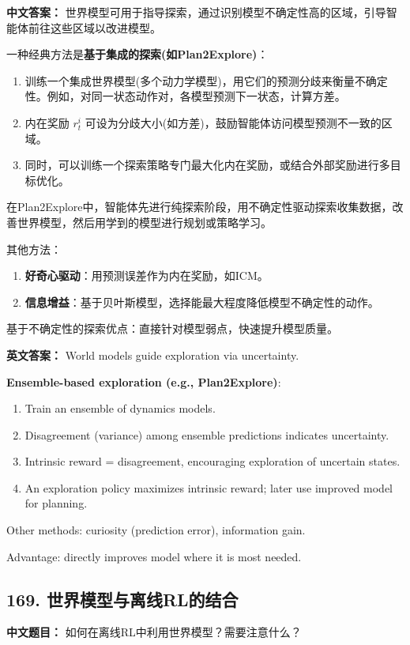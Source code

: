 \documentclass[10pt,a4paper]{ctexart}
\begin{document}
\textbf{中文答案：}  
世界模型可用于指导探索，通过识别模型不确定性高的区域，引导智能体前往这些区域以改进模型。

一种经典方法是\textbf{基于集成的探索(如Plan2Explore)}：

\begin{enumerate}
    \item 训练一个集成世界模型(多个动力学模型)，用它们的预测分歧来衡量不确定性。例如，对同一状态动作对，各模型预测下一状态，计算方差。
    \item 内在奖励 $r^i_t$ 可设为分歧大小(如方差)，鼓励智能体访问模型预测不一致的区域。
    \item 同时，可以训练一个探索策略专门最大化内在奖励，或结合外部奖励进行多目标优化。
\end{enumerate}

在Plan2Explore中，智能体先进行纯探索阶段，用不确定性驱动探索收集数据，改善世界模型，然后用学到的模型进行规划或策略学习。

其他方法：
\begin{enumerate}
    \item \textbf{\textbf{好奇心驱动}}：用预测误差作为内在奖励，如ICM。
    \item \textbf{\textbf{信息增益}}：基于贝叶斯模型，选择能最大程度降低模型不确定性的动作。
\end{enumerate}

基于不确定性的探索优点：直接针对模型弱点，快速提升模型质量。

\textbf{英文答案：}  
World models guide exploration via uncertainty.

\textbf{Ensemble-based exploration (e.g., Plan2Explore)}:
\begin{enumerate}
    \item Train an ensemble of dynamics models.
    \item Disagreement (variance) among ensemble predictions indicates uncertainty.
    \item Intrinsic reward = disagreement, encouraging exploration of uncertain states.
    \item An exploration policy maximizes intrinsic reward; later use improved model for planning.
\end{enumerate}

Other methods: curiosity (prediction error), information gain.

Advantage: directly improves model where it is most needed.

\subsection*{169. 世界模型与离线RL的结合}
\textbf{中文题目：} 如何在离线RL中利用世界模型？需要注意什么？
\end{document}
